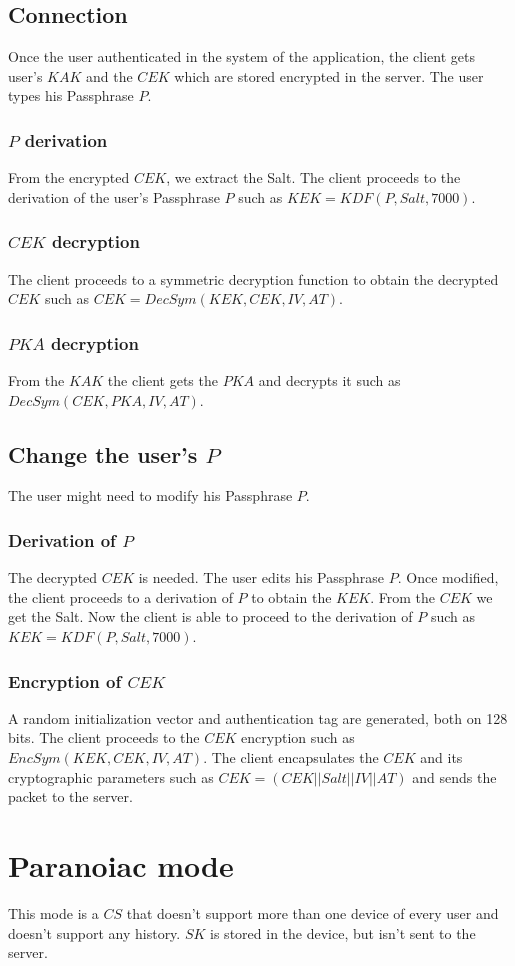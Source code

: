 \documentclass[a4paper,10pt]{article}
\begin{document}
\subsection{Connection}
Once the user authenticated in the system of the application, the client gets user's $KAK$ and the $CEK$ which are stored encrypted in the server. The user types his Passphrase $P$.
\subsubsection{$P$ derivation}
From the encrypted $CEK$, we extract the Salt. The client proceeds to the derivation of the user's Passphrase $P$ such as $KEK=KDF(P, Salt, 7000)$.
\subsubsection{$CEK$ decryption}
The client proceeds to a symmetric decryption function to obtain the decrypted $CEK$ such as $CEK=DecSym(KEK, CEK, IV,AT)$.
\subsubsection{$PKA$ decryption}
From the $KAK$ the client gets the $PKA$ and decrypts it such as $DecSym(CEK, PKA, IV, AT)$.

\subsection{Change the user's $P$}
The user might need to modify his Passphrase $P$.
\subsubsection{Derivation of $P$}
The decrypted $CEK$ is needed. The user edits his Passphrase $P$. Once modified, the client proceeds to a derivation of $P$ to obtain the $KEK$. From the $CEK$ we get the Salt. Now the client is able to proceed to the derivation of $P$ such as $KEK=KDF(P, Salt, 7000)$.
\subsubsection{Encryption of $CEK$}
A random initialization vector and authentication tag are generated, both on 128 bits. The client proceeds to the $CEK$ encryption such as $EncSym(KEK, CEK, IV, AT)$. The client encapsulates the $CEK$ and its cryptographic parameters such as $CEK=(CEK||Salt||IV||AT)$ and sends the packet to the server.

\section{Paranoiac mode}
This mode is a $CS$ that doesn't support more than one device of every user and doesn't support any history. $SK$ is stored in the device, but isn't sent to the server.
\end{document}
